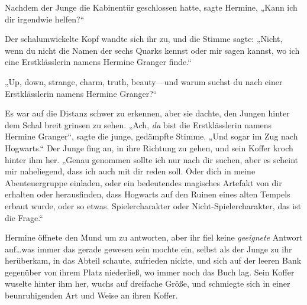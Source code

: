 Nachdem der Junge die Kabinentür geschlossen hatte, sagte Hermine, „Kann ich dir irgendwie helfen?“

Der schalumwickelte Kopf wandte sich ihr zu, und die Stimme sagte: „Nicht, wenn du nicht die Namen der sechs Quarks kennst oder mir sagen kannst, wo ich eine Erstklässlerin namens Hermine Granger finde.“

„Up, down, strange, charm, truth, beauty—und warum suchst du nach einer Erstklässlerin namens Hermine Granger?“

Es war auf die Distanz schwer zu erkennen, aber sie dachte, den Jungen hinter dem Schal breit grinsen zu sehen. „Ach, \emph{du} bist die Erstklässlerin namens Hermine Granger“, sagte die junge, gedämpfte Stimme. „Und sogar im Zug nach Hogwarts.“ Der Junge fing an, in ihre Richtung zu gehen, und sein Koffer kroch hinter ihm her. „Genau genommen sollte ich nur nach dir suchen, aber es scheint mir naheliegend, dass ich auch mit dir reden soll. Oder dich in meine Abenteuergruppe einladen, oder ein bedeutendes magisches Artefakt von dir erhalten oder herausfinden, dass Hogwarts auf den Ruinen eines alten Tempels erbaut wurde, oder so etwas. Spielercharakter oder Nicht-Spielercharakter, das ist die Frage.“

Hermine öffnete den Mund um zu antworten, aber ihr fiel keine \emph{geeignete} Antwort auf…was immer das gerade gewesen sein mochte ein, selbst als der Junge zu ihr herüberkam, in das Abteil schaute, zufrieden nickte, und sich auf der leeren Bank gegenüber von ihrem Platz niederließ, wo immer noch das Buch lag. Sein Koffer wuselte hinter ihm her, wuchs auf dreifache Größe, und schmiegte sich in einer beunruhigenden Art und Weise an ihren Koffer.

